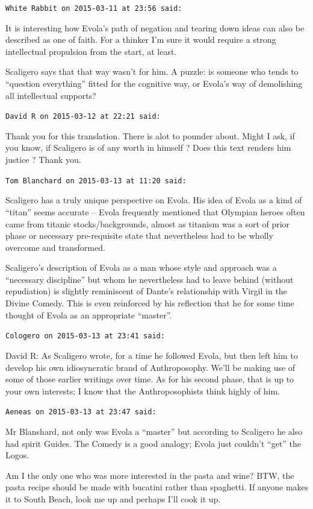 \begin{footnotesize}
\begin{sffamily}
\texttt{White Rabbit on 2015-03-11 at 23:56 said:}

It is interesting how Evola's path of negation and tearing down ideas can also be described as one of faith. For a thinker I'm sure it would require a strong intellectual propulsion from the start, at least.

Scaligero says that that way wasn't for him. A puzzle: is someone who tends to ``question everything'' fitted for the cognitive way, or Evola's way of demolishing all intellectual supports?

\hfill

\texttt{David R on 2015-03-12 at 22:21 said:}

Thank you for this translation. There is alot to pounder about. Might I ask, if you know, if Scaligero is of any worth in himself ? Does this text renders him justice ? Thank you.

\hfill

\texttt{Tom Blanchard on 2015-03-13 at 11:20 said:}

Scaligero has a truly unique perspective on Evola. His idea of Evola as a kind of ``titan'' seems accurate -- Evola frequently mentioned that Olympian heroes often came from titanic stocks/backgrounds, almost as titanism was a sort of prior phase or necessary pre-requisite state that nevertheless had to be wholly overcome and transformed.

Scaligero's description of Evola as a man whose style and approach was a ``necessary discipline'' but whom he nevertheless had to leave behind (without repudiation) is slightly reminiscent of Dante's relationship with Virgil in the Divine Comedy. This is even reinforced by his reflection that he for some time thought of Evola as an appropriate ``master''.

\hfill

\texttt{Cologero on 2015-03-13 at 23:41 said:}

David R: As Scaligero wrote, for a time he followed Evola, but then left him to develop his own idiosyncratic brand of Anthroposophy. We'll be making use of some of those earlier writings over time. As for his second phase, that is up to your own interests; I know that the Anthroposophists think highly of him.

\hfill

\texttt{Aeneas on 2015-03-13 at 23:47 said:}

Mr Blanshard, not only was Evola a ``master'' but according to Scaligero he also had spirit Guides. The Comedy is a good analogy; Evola just couldn't ``get'' the Logos.

Am I the only one who was more interested in the pasta and wine? BTW, the pasta recipe should be made with bucatini rather than spaghetti. If anyone makes it to South Beach, look me up and perhaps I'll cook it up.

\hfill


\end{sffamily}
\end{footnotesize}

